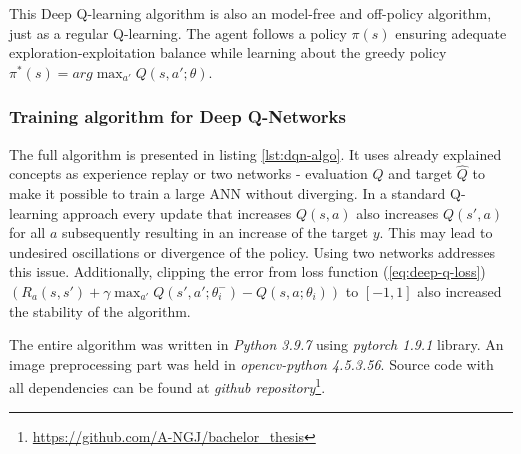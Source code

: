 This Deep Q-learning algorithm is also an model-free and off-policy algorithm, just as a regular Q-learning. The agent follows a policy $\pi(s)$
ensuring adequate exploration-exploitation balance while learning about the greedy policy $\pi^*(s) = arg\max_{a'}Q(s, a'; \theta)$.

\subsubsection*{Training algorithm for Deep Q-Networks}
\label{sub2:training-algo-for-deep-q-net}

The full algorithm is presented in listing \ref{lst:dqn-algo}. It uses already explained concepts as experience replay or two networks - evaluation $Q$ and
target $\hat{Q}$ to make it possible to train a large ANN without diverging. In a standard Q-learning approach every update that increases $Q(s,
a)$ also increases $Q(s', a)$ for all $a$ subsequently resulting in an increase of the target $y$. This may lead to undesired oscillations or
divergence of the policy. Using two networks addresses this issue. Additionally, clipping the error from loss function (\ref{eq:deep-q-loss})
$\left(R_a(s, s') + \gamma \max_{a'} Q(s', a'; \theta^-_i) - Q(s, a; \theta_i) \right)$ to $[-1, 1]$ also increased the stability of the algorithm.

The entire algorithm was written in \emph{Python 3.9.7} using \emph{pytorch 1.9.1} library. An image preprocessing part was held in \emph{opencv-python 4.5.3.56}. Source code with all dependencies can be found at \emph{github
repository}\footnote{\url{https://github.com/A-NGJ/bachelor_thesis}}.

